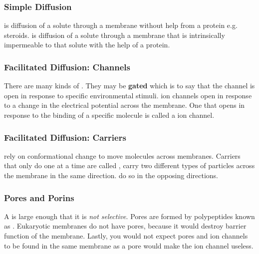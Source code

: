 \documentclass[../Bio_chemistryReview.tex]{subfiles}
\begin{document}
\subsubsection{Simple Diffusion}
 is diffusion of a solute through a
membrane without help from a protein e.g. steroids.  is diffusion of a solute through a membrane
that is intrinsically impermeable to that solute with the help of a protein.

\subsubsection{Facilitated Diffusion: Channels}
There are many kinds of . They may be \textbf{gated} which is to say that the channel is open
in response to specific environmental stimuli.  ion channels open
in response to a change in the electrical potential across the membrane. One
that opens in response to the binding of a specific molecule is called a
ion channel.

\subsubsection{Facilitated Diffusion: Carriers}
 rely on
conformational change to move molecules across membranes. Carriers that only do
one at a time are called 
,  carry two different types of particles across the membrane
in the same direction.  do so in the opposing directions.

\subsubsection{Pores and Porins}
A  is large enough that it is \textit{not selective}. Pores are
formed by polypeptides known as . Eukaryotic membranes do not
have pores, because it would destroy barrier function of the membrane. Lastly,
you would not expect pores and ion channels to be found in the same membrane as
a pore would make the ion channel useless.
\end{document}
